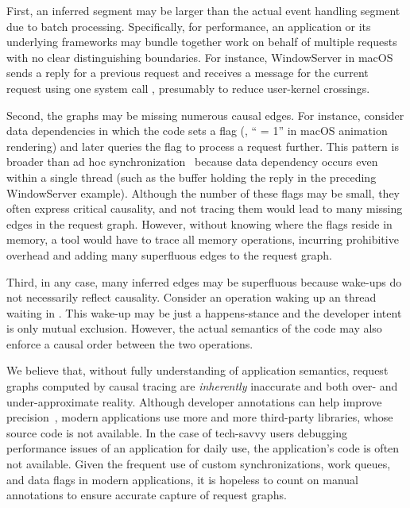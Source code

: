 First, an inferred segment may be larger than the actual event handling segment
due to batch processing. Specifically, for performance, an application or its
underlying frameworks may bundle together work on behalf of multiple requests
with no clear distinguishing boundaries. For instance, WindowServer in macOS
sends a reply for a previous request and receives a message for the current
request using one system call , presumably to
reduce user-kernel crossings.

Second, the graphs may be missing numerous causal edges. For instance, consider
data dependencies in which the code sets a flag (\eg, `` = 1''
in macOS animation rendering) and later queries the flag to process a request
further. This pattern is broader than ad hoc synchronization~\cite{xiong2010ad}
because data dependency occurs even within a single thread (such as the buffer
holding the reply in the preceding WindowServer example). Although the number of
these flags may be small, they often express critical causality, and not tracing
them would lead to many missing edges in the request graph. However, without
knowing where the flags reside in memory, a tool would have to trace all memory
operations, incurring prohibitive overhead and adding many superfluous edges to
the request graph.

Third, in any case, many inferred edges may be superfluous because wake-ups do
not necessarily reflect causality. Consider an  operation waking up
an thread waiting in . This wake-up may be just a happens-stance and
the developer intent is only mutual exclusion. However, the actual semantics of
the code may also enforce a causal order between the two operations.

We believe that, without fully understanding of application semantics, request
graphs computed by causal tracing are \emph{inherently} inaccurate and both
over- and under-approximate reality. Although developer annotations can help
improve precision~\cite{reynolds2006pip, fonseca2007x}, modern applications use
more and more third-party libraries, whose source code is not available. In the
case of tech-savvy users debugging performance issues of an application for
daily use, the application's code is often not available. Given the frequent
use of custom synchronizations, work queues, and data flags in modern
applications, it is hopeless to count on manual annotations to ensure accurate
capture of request graphs.


